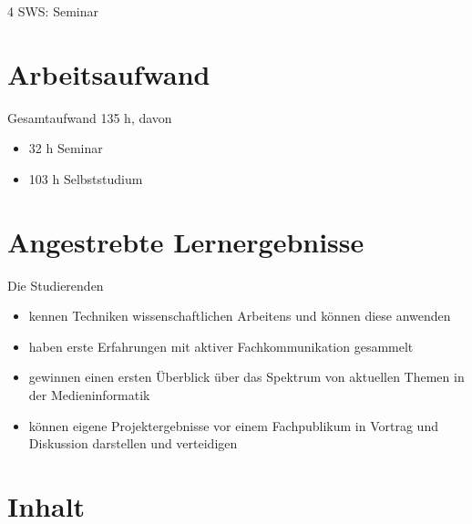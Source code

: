4 SWS: Seminar

\hypertarget{arbeitsaufwandpathlabelmi-2017modulbeschreibungen-bachelorba_praxisprojektseminar}{%
\section*{Arbeitsaufwand\label{/mi-2017/modulbeschreibungen-bachelor/BA_Praxisprojektseminar}}\label{arbeitsaufwandpathlabelmi-2017modulbeschreibungen-bachelorba_praxisprojektseminar}}

Gesamtaufwand 135 h, davon

\begin{itemize}
\tightlist
\item
  32 h Seminar
\item
  103 h Selbststudium
\end{itemize}

\hypertarget{angestrebte-lernergebnissepathlabelmi-2017modulbeschreibungen-bachelorba_praxisprojektseminar}{%
\section*{Angestrebte
Lernergebnisse\label{/mi-2017/modulbeschreibungen-bachelor/BA_Praxisprojektseminar}}\label{angestrebte-lernergebnissepathlabelmi-2017modulbeschreibungen-bachelorba_praxisprojektseminar}}

Die Studierenden

\begin{itemize}
\tightlist
\item
  kennen Techniken wissenschaftlichen Arbeitens und können diese
  anwenden
\item
  haben erste Erfahrungen mit aktiver Fachkommunikation gesammelt
\item
  gewinnen einen ersten Überblick über das Spektrum von aktuellen Themen
  in der Medieninformatik
\item
  können eigene Projektergebnisse vor einem Fachpublikum in Vortrag und
  Diskussion darstellen und verteidigen
\end{itemize}

\hypertarget{inhaltpathlabelmi-2017modulbeschreibungen-bachelorba_praxisprojektseminar}{%
\section*{Inhalt\label{/mi-2017/modulbeschreibungen-bachelor/BA_Praxisprojektseminar}}\label{inhaltpathlabelmi-2017modulbeschreibungen-bachelorba_praxisprojektseminar}}

